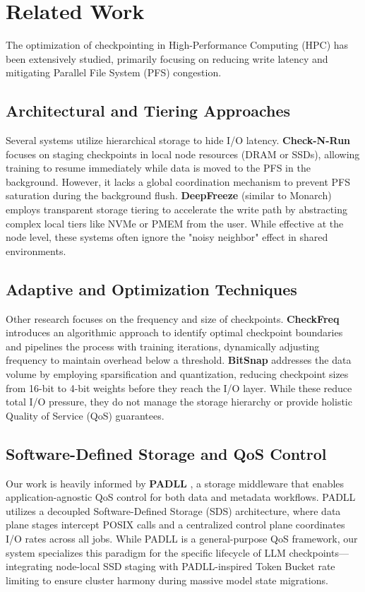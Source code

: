 \documentclass[conference,a4paper]{IEEEtran}
\begin{document}
\section{Related Work}

The optimization of checkpointing in High-Performance Computing (HPC) has been extensively studied, primarily focusing on reducing write 
latency and mitigating Parallel File System (PFS) congestion.

\subsection{Architectural and Tiering Approaches}
Several systems utilize hierarchical storage to hide I/O latency. \textbf{Check-N-Run} \cite{CheckNRun} focuses on staging checkpoints in local node resources 
(DRAM or SSDs), allowing training to resume immediately while data is moved to the PFS in the background. However, it lacks a global coordination 
mechanism to prevent PFS saturation during the background flush. \textbf{DeepFreeze} \cite{DeepFreeze} (similar to Monarch) employs transparent storage tiering to 
accelerate the write path by abstracting complex local tiers like NVMe or PMEM from the user. While effective at the node level, these 
systems often ignore the "noisy neighbor" effect in shared environments.

\subsection{Adaptive and Optimization Techniques}
Other research focuses on the frequency and size of checkpoints. \textbf{CheckFreq} \cite{CheckFreq} introduces an algorithmic approach to identify optimal checkpoint
boundaries and pipelines the process with training iterations, dynamically adjusting frequency to maintain overhead below a threshold. 
\textbf{BitSnap} \cite{BitSnap} addresses the data volume by employing sparsification and quantization, reducing checkpoint sizes from 16-bit to 4-bit weights before
they reach the I/O layer. While these reduce total I/O pressure, they do not manage the storage hierarchy or provide holistic Quality of Service
(QoS) guarantees.

\subsection{Software-Defined Storage and QoS Control}
Our work is heavily informed by \textbf{PADLL} \cite{PADLL}, a storage middleware that enables application-agnostic QoS control for both data and metadata workflows.
PADLL utilizes a decoupled Software-Defined Storage (SDS) architecture, where data plane stages intercept POSIX calls and a centralized 
control plane coordinates I/O rates across all jobs. While PADLL is a general-purpose QoS framework, our system specializes this paradigm for
the specific lifecycle of LLM checkpoints—integrating node-local SSD staging with PADLL-inspired Token Bucket rate limiting to ensure cluster harmony 
during massive model state migrations.
\end{document}
